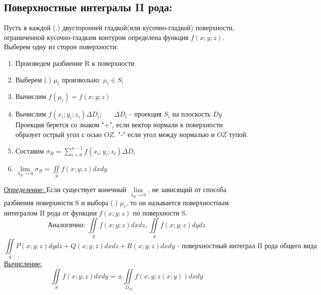 \documentclass[12pt]{article}
\let\oldiint\iint
\let\oldsum\sum
\let\oldlim\lim
\renewcommand{\iint}{\oldiint\limits}
\renewcommand{\sum}{\oldsum\limits}
\renewcommand{\lim}{\oldlim\limits}
\begin{document}
  \subsection*{Поверхностные интегралы II рода:}
  Пусть в каждой (.) двусторонней гладкой(или кусочно-гладкой) поверхности, ограниченной кусочно-гладким контуром
  определена функция $f(x;y;z)$.\\ Выберем одну из сторон поверхности:
  \begin{enumerate}
    \item Произведем разбиение R к поверхности
    \item Выберем (.) $\mu_i$ произвольно: $\mu_i \in S_i$
    \item Вычислим $f(\mu_i)=f(x;y;z)$
    \item Вычислим $f(x_i;y_i;z_i)\Delta D_i; \hspace{20pt} \Delta D_i$ - проекция $S_i$ на плоскость $Dy$\\
    Проекция берется со знаком "+", если вектор нормали к поверхности образует острый угол с осью $OZ$. "-" если угол
    между нормалью и $OZ$ тупой.
    \item Составим $\sigma_R=\sum_{i=0}^{n-1}f(x_i;y_i;z_i)\Delta D_i$
    \item $\lim_{\lambda_R \to 0}\sigma_R=\iint_S f(x;y;z)dxdy$
  \end{enumerate}
  \underline{Определение: }  Если существует конечный $\lim_{\lambda_R \to 0}$, не зависящий от способа разбиения
  поверхности S и выбора (.) $\mu_i$, то он называется поверхностным интегралом II рода от функции $f(x;y;z)$ по 
  поверхности S.\\
   \[\text{Аналогично: }\iint_S f(x;y;z)dxdz, \iint_S f(x;y;z)dydz\]
  \[\iint_S P(x;y;z)dydz+Q(x;y;z)dxdz+R(x;y;z)dxdy\text{ - поверхностный интеграл II рода общего вида}\]
  \underline{Вычисление: }
  \[\iint_S f(x;y;z)dxdy = \pm \iint_{D_{xy}} f(x;y;z(x;y))dxdy\]
  \pagebreak
\end{document}
